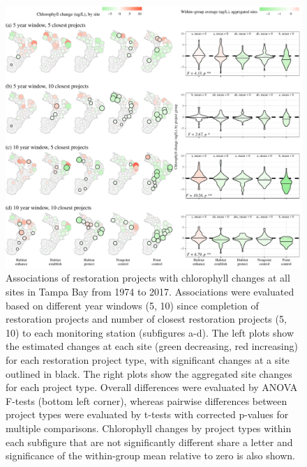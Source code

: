 \documentclass[]{article}
\begin{document}
\begin{figure}
\includegraphics[width=1\linewidth]{figs/prjsig} \caption{Associations of restoration projects with chlorophyll changes at all sites in Tampa Bay from 1974 to 2017.  Associations were evaluated based on different year windows (5, 10) since completion of restoration projects and number of closest restoration projects (5, 10) to each monitoring station (subfigures a-d).  The left plots show the estimated changes at each site (green decreasing, red increasing) for each restoration project type, with significant changes at a site outlined in black.  The right plots show the aggregated site changes for each project type.  Overall differences were evaluated by ANOVA F-tests (bottom left corner), whereas pairwise differences between project types were evaluated by t-tests with corrected p-values for multiple comparisons.  Chlorophyll changes by project types within each subfigure that are not significantly different share a letter and significance of the within-group mean relative to zero is also shown.}\label{fig:prjsig}
\end{figure}
\end{document}

